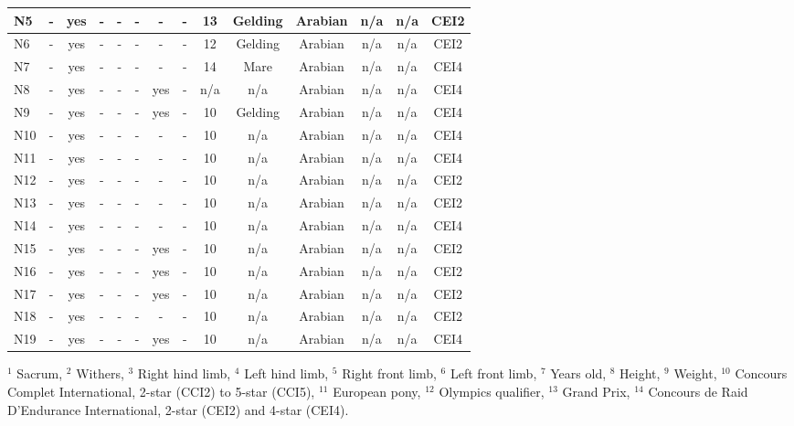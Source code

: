 \begin{table}[!htbp]
{\begin{tabular}{|l|c|c|c|c|c|c|c|c|c|c|c|c|c|}
        N5 & - & yes & - & - & - & - & - & 13 & Gelding & Arabian & n/a & n/a &  CEI2  \\ \hline
        N6 & - & yes & - & - & - & - & - & 12 & Gelding & Arabian & n/a & n/a &  CEI2 \\ \hline
        N7 & - & yes & - & - & - & - & - & 14 & Mare & Arabian & n/a & n/a &  CEI4  \\ \hline
        N8 & - & yes & - & - & - & yes & - & n/a & n/a & Arabian & n/a & n/a &  CEI4  \\ \hline
        N9 & - & yes & - & - & - & yes & - & 10 & Gelding & Arabian & n/a & n/a &  CEI4  \\ \hline
        N10 & - & yes & - & - & - & - & - & 10 & n/a & Arabian & n/a & n/a & CEI4  \\ \hline
        N11 & - & yes & - & - & - & - & - & 10 & n/a & Arabian & n/a & n/a & CEI4\\ \hline
        N12 & - & yes & - & - & - & - & - & 10 & n/a & Arabian & n/a & n/a & CEI2\\ \hline
        N13 & - & yes & - & - & - & - & - & 10 & n/a & Arabian & n/a & n/a & CEI2\\ \hline
        N14 & - & yes & - & - & - & - & - & 10 & n/a & Arabian & n/a & n/a & CEI4\\ \hline
        N15 & - & yes & - & - & - & yes & - & 10 & n/a & Arabian & n/a & n/a &  CEI2  \\ \hline
        N16 & - & yes & - & - & - & yes & - & 10 & n/a & Arabian & n/a & n/a &  CEI2  \\ \hline
        N17 & - & yes & - & - & - & yes & - & 10 & n/a & Arabian & n/a & n/a &  CEI2  \\ \hline
        N18 & - & yes & - & - & - & - & - & 10 & n/a & Arabian & n/a & n/a & CEI2\\ \hline
        N19 & - & yes & - & - & - & yes & - & 10 & n/a & Arabian & n/a & n/a &  CEI4  \\ \hline
        
    \end{tabular}}
    \label{IMU info on horses}
\footnotesize{$^1$ Sacrum,  $^2$ Withers,  $^3$ Right hind limb,  $^4$ Left hind limb,  $^5$ Right front limb,  $^6$ Left front limb,  $^7$ Years old,  $^8$ Height,  $^9$ Weight,  $^{10}$ Concours Complet International, 2-star (CCI2) to 5-star (CCI5),  $^{11}$ European pony,  $^{12}$ Olympics qualifier,  $^{13}$ Grand Prix,  $^{14}$ Concours de Raid D'Endurance International, 2-star (CEI2) and 4-star (CEI4).}\\
\end{table}